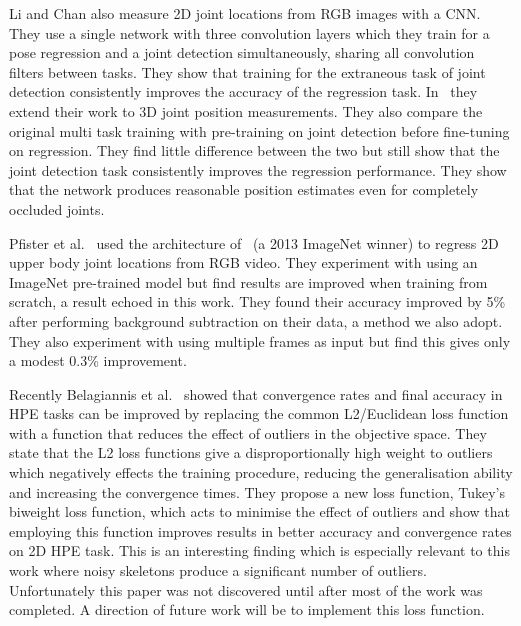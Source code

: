 \documentclass[11pt]{article} %
\begin{document}
Li and Chan also measure 2D joint locations from RGB images with a CNN. They use a single network with three convolution layers which they train for a pose regression and a joint detection simultaneously, sharing all convolution filters between tasks. They show that training for the extraneous task of joint detection consistently improves the accuracy of the regression task. In~\cite{Accv2014} they extend their work to 3D joint position measurements. They also compare the original multi task training with pre-training on joint detection before fine-tuning on regression. They find little difference between the two but still show that the joint detection task consistently improves the regression performance. They show that the network produces reasonable position estimates even for completely occluded joints. 

Pfister et al.~\cite{Pfister} used the architecture of~\cite{Sermanet2013a} (a 2013 ImageNet winner) to regress 2D upper body joint locations from RGB video. They experiment with using an ImageNet pre-trained model but find results are improved when training from scratch, a result echoed in this work. They found their accuracy improved by 5\% after performing background subtraction on their data, a method we also adopt. They also experiment with using multiple frames as input but find this gives only a modest 0.3\% improvement. 


Recently Belagiannis et al.~\cite{Belagiannis} showed that convergence rates and final accuracy in HPE tasks can be improved by replacing the common L2/Euclidean loss function with a function that reduces the effect of outliers in the objective space. They state that the L2 loss functions give a disproportionally high weight to outliers which negatively effects the training procedure, reducing the generalisation ability and increasing the convergence times. They propose a new loss function, Tukey's biweight loss function, which acts to minimise the effect of outliers and show that employing this function improves results in better accuracy and convergence rates on 2D HPE task. This is an interesting finding which is especially relevant to this work where noisy skeletons produce a significant number of outliers. Unfortunately this paper was not discovered until after most of the work was completed. A direction of future work will be to implement this loss function.



\end{document}
